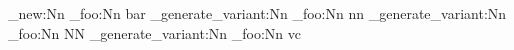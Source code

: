 \cs_new:Nn
  \module_foo:Nn
  { bar }
\cs_generate_variant:Nn  %
  \module_foo:Nn
  { nn }
\cs_generate_variant:Nn  %
  \module_foo:Nn
  { NN }
\cs_generate_variant:Nn  %
  \module_foo:Nn
  { vc }
